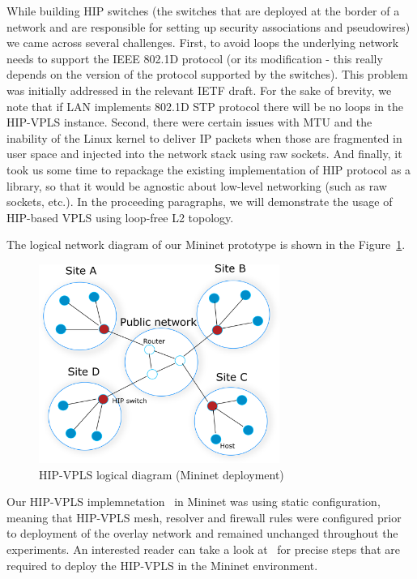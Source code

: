 While building HIP switches (the switches that are deployed at the border of a network and are responsible 
for setting up security associations and pseudowires) we came across several challenges. 
First, to avoid loops the underlying network needs to support 
the IEEE 802.1D protocol (or its modification - this really depends on the version of the protocol 
supported by the switches). This problem was initially addressed in the relevant IETF draft. 
For the sake of brevity, we note that if LAN implements 802.1D STP protocol there will be no loops in the 
HIP-VPLS instance. Second, there were certain issues with MTU and the inability of the Linux kernel to deliver IP 
packets when those are fragmented in user space and injected into the network stack using raw 
sockets. And finally, it took us some time to repackage the existing implementation of HIP protocol 
as a library, so that it would be agnostic about low-level networking (such as raw sockets, etc.). 
In the proceeding paragraphs, we will demonstrate the usage of HIP-based VPLS using loop-free L2 topology.

The logical network diagram of our Mininet prototype is shown in the Figure~\ref{fig:mininet}.

\begin{figure}[h!]
    \centering
    \includegraphics[width=0.7\textwidth]{graphics/mininet.png}
    \caption{HIP-VPLS logical diagram (Mininet deployment)}
    \label{fig:mininet}
\end{figure}

Our HIP-VPLS implemnetation~\cite{hip-vpls:mininet} in Mininet was using static configuration, meaning that 
HIP-VPLS mesh, resolver and firewall rules were configured prior to deployment 
of the overlay network and remained unchanged throughout the experiments. An interested reader
can take a look at~\cite{hip-vpls:mininet} for precise steps that are required to 
deploy the HIP-VPLS in the Mininet environment.

